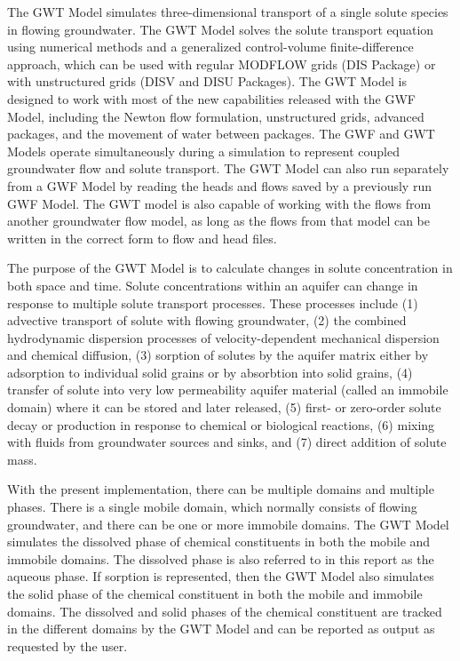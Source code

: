 The GWT Model simulates three-dimensional transport of a single solute species in flowing groundwater.  The GWT Model solves the solute transport equation using numerical methods and a generalized control-volume finite-difference approach, which can be used with regular MODFLOW grids (DIS Package) or with unstructured grids (DISV and DISU Packages).  The GWT Model is designed to work with most of the new capabilities released with the GWF Model, including the Newton flow formulation, unstructured grids, advanced packages, and the movement of water between packages.  The GWF and GWT Models operate simultaneously during a \mf simulation to represent coupled groundwater flow and solute transport.  The GWT Model can also run separately from a GWF Model by reading the heads and flows saved by a previously run GWF Model.  The GWT model is also capable of working with the flows from another groundwater flow model, as long as the flows from that model can be written in the correct form to flow and head files.  

The purpose of the GWT Model is to calculate changes in solute concentration in both space and time.  Solute concentrations within an aquifer can change in response to multiple solute transport processes.  These processes include (1) advective transport of solute with flowing groundwater, (2) the combined hydrodynamic dispersion processes of velocity-dependent mechanical dispersion and chemical diffusion, (3) sorption of solutes by the aquifer matrix either by adsorption to individual solid grains or by absorbtion into solid grains, (4) transfer of solute into very low permeability aquifer material (called an immobile domain) where it can be stored and later released, (5) first- or zero-order solute decay or production in response to chemical or biological reactions, (6) mixing with fluids from groundwater sources and sinks, and (7) direct addition of solute mass.

With the present implementation, there can be multiple domains and multiple phases.  There is a single mobile domain, which normally consists of flowing groundwater, and there can be one or more immobile domains.  The GWT Model simulates the dissolved phase of chemical constituents in both the mobile and immobile domains.  The dissolved phase is also referred to in this report as the aqueous phase.  If sorption is represented, then the GWT Model also simulates the solid phase of the chemical constituent in both the mobile and immobile domains.  The dissolved and solid phases of the chemical constituent are tracked in the different domains by the GWT Model and can be reported as output as requested by the user.

